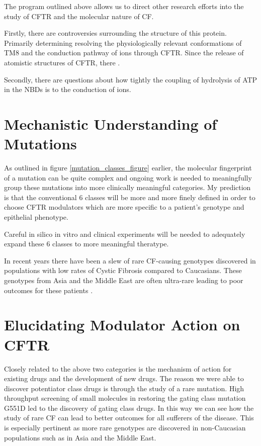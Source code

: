 


The program outlined above allows us to direct other research efforts into the study of CFTR and the molecular nature of CF. 

Firstly, there are controversies surrounding the structure of this protein. Primarily determining resolving the physiologically relevant conformations of TM8 and the conduction pathway of ions through CFTR. Since the release of atomistic structures of CFTR, there .

Secondly, there are questions about how tightly the coupling of hydrolysis of ATP in the NBDs is to the conduction of ions.

\section{Mechanistic Understanding of Mutations}
As outlined in figure \ref{mutation_classes_figure} earlier, the molecular fingerprint of a mutation can be quite complex and ongoing work is needed to meaningfully group these mutations into more clinically meaningful categories. My prediction is that the conventional 6 classes will be more and more finely defined in order to choose CFTR modulators which are more specific to a patient's genotype and epithelial phenotype. 

Careful in silico in vitro and clinical experiments will be needed to adequately expand these 6 classes to more meaningful theratype.

In recent years there have been a slew of rare CF-causing genotypes discovered in populations with low rates of Cystic Fibrosis compared to Caucasians. These genotypes from Asia and the Middle East are often ultra-rare leading to poor outcomes for these patients \cite{}. 

\section{Elucidating Modulator Action on CFTR}
Closely related to the above two categories is the mechanism of action for existing drugs and the development of new drugs. The reason we were able to discover potentiator class drugs is through the study of a rare mutation. High throughput screening of small molecules in restoring the gating class mutation G551D led to the discovery of gating class drugs. In this way we can see how the study of rare CF can lead to better outcomes for all sufferers of the disease. This is especially pertinent as more rare genotypes are discovered in non-Caucasian populations such as in Asia and the Middle East.  

